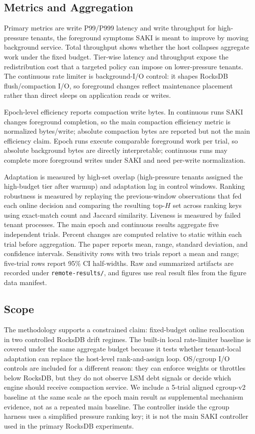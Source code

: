 \subsection{Metrics and Aggregation}

Primary metrics are write P99/P999 latency and write throughput for
high-pressure tenants, the foreground symptoms SAKI is meant to improve by
moving background service. Total throughput shows whether the host collapses
aggregate work under the fixed budget. Tier-wise latency and throughput expose
the redistribution cost that a targeted policy can impose on lower-pressure
tenants. The continuous rate limiter is background-I/O control: it shapes
RocksDB flush/compaction I/O, so foreground changes reflect maintenance
placement rather than direct sleeps on application reads or writes.

Epoch-level efficiency reports compaction write bytes. In continuous runs SAKI
changes foreground completion, so the main compaction efficiency metric is
normalized bytes/write; absolute compaction bytes are reported but not the main
efficiency claim. Epoch runs execute comparable foreground work per trial, so
absolute background bytes are directly interpretable; continuous runs may
complete more foreground writes under SAKI and need per-write normalization.

Adaptation is measured by high-set overlap (high-pressure tenants assigned the
high-budget tier after warmup) and adaptation lag in control windows. Ranking
robustness is measured by replaying the previous-window observations that fed
each online decision and comparing the resulting top-\(H\) set across ranking
keys using exact-match count and Jaccard similarity. Liveness is measured
by failed tenant processes. The main epoch and continuous results aggregate
five independent trials. Percent changes are computed relative to static within
each trial before aggregation. The paper reports mean, range, standard
deviation, and confidence intervals. Sensitivity rows with two trials report a
mean and range; five-trial rows report 95\% CI half-widths. Raw and summarized
artifacts are recorded under \texttt{remote-results/}, and figures use real
result files from the figure data manifest.

\subsection{Scope}

The methodology supports a constrained claim: fixed-budget online reallocation
in two controlled RocksDB drift regimes. The built-in local rate-limiter
baseline is covered under the same aggregate budget because it tests whether
tenant-local adaptation can replace the host-level rank-and-assign loop.
OS/cgroup I/O controls are included for a different reason: they can enforce
weights or throttles below RocksDB, but they do not observe LSM debt signals or
decide which engine should receive compaction service. We include a 5-trial
aligned cgroup-v2 baseline at the same scale as the epoch main result as
supplemental mechanism evidence, not as a repeated main baseline. The
controller inside the cgroup harness uses a simplified pressure ranking key;
it is not the main SAKI controller used in the primary RocksDB experiments.
